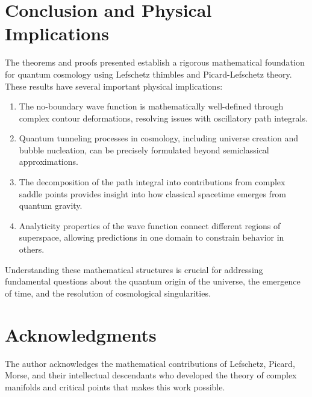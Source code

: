 \documentclass{article}
\begin{document}
\section{Conclusion and Physical Implications}

The theorems and proofs presented establish a rigorous mathematical foundation for quantum cosmology using Lefschetz thimbles and Picard-Lefschetz theory. These results have several important physical implications:

\begin{enumerate}
\item The no-boundary wave function is mathematically well-defined through complex contour deformations, resolving issues with oscillatory path integrals.

\item Quantum tunneling processes in cosmology, including universe creation and bubble nucleation, can be precisely formulated beyond semiclassical approximations.

\item The decomposition of the path integral into contributions from complex saddle points provides insight into how classical spacetime emerges from quantum gravity.

\item Analyticity properties of the wave function connect different regions of superspace, allowing predictions in one domain to constrain behavior in others.
\end{enumerate}

Understanding these mathematical structures is crucial for addressing fundamental questions about the quantum origin of the universe, the emergence of time, and the resolution of cosmological singularities.

\section*{Acknowledgments}
The author acknowledges the mathematical contributions of Lefschetz, Picard, Morse, and their intellectual descendants who developed the theory of complex manifolds and critical points that makes this work possible.
\end{document}
